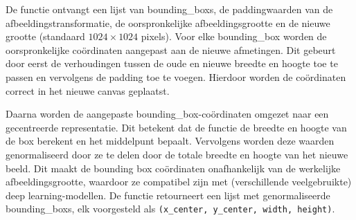 De functie ontvangt een lijst van \glspl{bounding_box}, de paddingwaarden van de afbeeldingstransformatie, de oorspronkelijke afbeeldingsgrootte en de nieuwe grootte (standaard $1024 \times 1024$ pixels). Voor elke \gls{bounding_box} worden de oorspronkelijke coördinaten aangepast aan de nieuwe afmetingen. Dit gebeurt door eerst de verhoudingen tussen de oude en nieuwe breedte en hoogte toe te passen en vervolgens de padding toe te voegen. Hierdoor worden de coördinaten correct in het nieuwe canvas geplaatst.

Daarna worden de aangepaste \gls{bounding_box}-coördinaten omgezet naar een gecentreerde representatie. Dit betekent dat de functie de breedte en hoogte van de box berekent en het middelpunt bepaalt. Vervolgens worden deze waarden genormaliseerd door ze te delen door de totale breedte en hoogte van het nieuwe beeld. Dit maakt de bounding box coördinaten onafhankelijk van de werkelijke afbeeldingsgrootte, waardoor ze compatibel zijn met (verschillende veelgebruikte) deep learning-modellen. De functie retourneert een lijst met genormaliseerde \glspl{bounding_box}, elk voorgesteld als \texttt{(x\_center, y\_center, width, height)}.